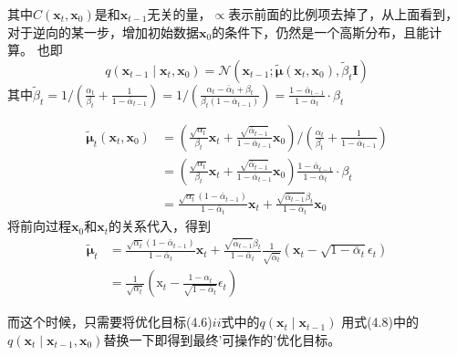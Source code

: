 \documentclass[lang=cn,newtx,10pt,scheme=chinese]{elegantbook}
\begin{document}
其中$C\left(\mathbf{x}_t, \mathbf{x}_0\right)$是和$\mathbf{x}_{t-1}$无关的量，$\propto $表示前面的比例项去掉了，从上面看到，对于逆向的某一步，增加初始数据$\mathbf{x}_0$的条件下，仍然是一个高斯分布，且能计算。
也即
\begin{equation}
q\left(\mathbf{x}_{t-1} \mid \mathbf{x}_t, \mathbf{x}_0\right)=\mathcal{N}\left(\mathbf{x}_{t-1} ; \tilde{\boldsymbol{\mu}}\left(\mathbf{x}_t, \mathbf{x}_0\right), \tilde{\beta}_t \mathbf{I}\right)
\end{equation}
其中$\tilde{\beta}_t=1 /\left(\frac{\alpha_t}{\beta_t}+\frac{1}{1-\bar{\alpha}_{t-1}}\right)=1 /\left(\frac{\alpha_t-\bar{\alpha}_t+\beta_t}{\beta_t\left(1-\bar{\alpha}_{t-1}\right)}\right)=\frac{1-\bar{\alpha}_{t-1}}{1-\bar{\alpha}_t} \cdot \beta_t$

\begin{equation}
\begin{aligned}
\tilde{\boldsymbol{\mu}}_t\left(\mathbf{x}_t, \mathbf{x}_0\right) & =\left(\frac{\sqrt{\alpha_t}}{\beta_t} \mathbf{x}_t+\frac{\sqrt{\bar{\alpha}_{t-1}}}{1-\bar{\alpha}_{t-1}} \mathbf{x}_0\right) /\left(\frac{\alpha_t}{\beta_t}+\frac{1}{1-\bar{\alpha}_{t-1}}\right) \\
& =\left(\frac{\sqrt{\alpha_t}}{\beta_t} \mathbf{x}_t+\frac{\sqrt{\bar{\alpha}_{t-1}}}{1-\bar{\alpha}_{t-1}} \mathbf{x}_0\right) \frac{1-\bar{\alpha}_{t-1}}{1-\bar{\alpha}_t} \cdot \beta_t \\
& =\frac{\sqrt{\alpha_t}\left(1-\bar{\alpha}_{t-1}\right)}{1-\bar{\alpha}_t} \mathbf{x}_t+\frac{\sqrt{\bar{\alpha}_{t-1}} \beta_t}{1-\bar{\alpha}_t} \mathbf{x}_0
\end{aligned}
\end{equation}
将前向过程$\mathbf{x}_0$和$\mathbf{x}_t$的关系代入，得到
\begin{equation}
\begin{aligned}
\tilde{\boldsymbol{\mu}}_t & =\frac{\sqrt{\alpha_t}\left(1-\bar{\alpha}_{t-1}\right)}{1-\bar{\alpha}_t} \mathbf{x}_t+\frac{\sqrt{\bar{\alpha}_{t-1}} \beta_t}{1-\bar{\alpha}_t} \frac{1}{\sqrt{\bar{\alpha}_t}}\left(\mathbf{x}_t-\sqrt{1-\bar{\alpha}_t} \epsilon_t\right) \\
& =\frac{1}{\sqrt{\alpha_t}}\left(\mathrm{x}_t-\frac{1-\alpha_t}{\sqrt{1-\bar{\alpha}_t}} \epsilon_t\right)
\end{aligned}
\end{equation}

而这个时候，只需要将优化目标(4.6)$ii$式中的$q(\mathbf{x}_t \mid \mathbf{x}_{t-1})$
用式(4.8)中的$q(\mathbf{x}_t \mid \mathbf{x}_{t-1},\mathbf{x}_0)$替换一下即得到最终'可操作的'优化目标。
\end{document}
